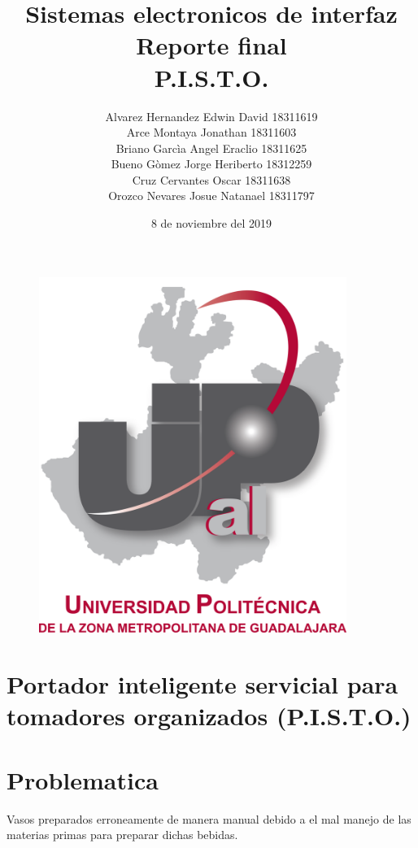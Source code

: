 \documentclass[12pt,a4paper]{article}
\begin{document}
\title{\textbf{Sistemas electronicos de interfaz\\Reporte final\\P.I.S.T.O.}}
\author{Alvarez Hernandez Edwin David 18311619\\Arce Montaya Jonathan 18311603\\Briano Garcìa Angel Eraclio 18311625\\Bueno Gòmez Jorge Heriberto 18312259\\Cruz Cervantes Oscar 18311638\\Orozco Nevares Josue Natanael 18311797}
\date{8 de noviembre del 2019}

\begin{figure}
\centering
\includegraphics[width=10cm]{UPCDLZMDG5783-logo.png} 
\end{figure}
\maketitle
\newpage

\section{Portador inteligente servicial para tomadores organizados (P.I.S.T.O.)}

\section{Problematica}
Vasos preparados erroneamente de manera manual debido a el mal manejo de las materias primas para preparar dichas bebidas.
\end{document}
